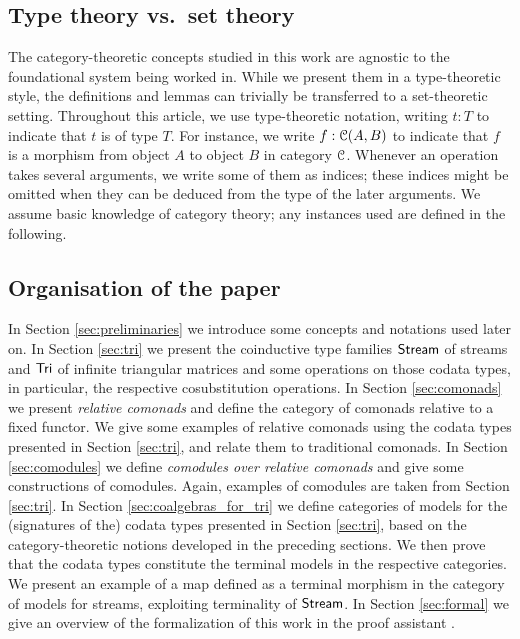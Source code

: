 \documentclass[a4paper,USenglish]{lipics}
\begin{document}
 \subsection{Type theory vs.\ set theory} \label{sec:type_vs_set} The category-theoretic concepts studied in this work are agnostic to the foundational system being worked in.
 While we present them in a type-theoretic style, the definitions and lemmas can trivially be transferred to a set-theoretic setting.
 Throughout this article, we use type-theoretic notation,  writing $t:T$ to indicate that $t$ is of type $T$. 
 For instance, we write $f : {\mathcal{C}}(A,B)$ to indicate that $f$ is a morphism from object $A$ to object $B$ in category ${\mathcal{C}}$.
 Whenever an operation takes several arguments, we write some of them as indices; these indices might be omitted when 
 they can be deduced from the type of the later arguments.
 We assume basic knowledge of category theory; any instances used are defined in the following.
  
 
 
 \subsection{Organisation of the paper} \label{sec:organisation}
  In Section \ref{sec:preliminaries} we introduce some concepts and notations used later on.
  In Section \ref{sec:tri} we present the coinductive type families $\mathsf{Stream}$ of streams and $\mathsf{Tri}$ of infinite triangular matrices and some operations on those codata types,
  in particular, the respective cosubstitution operations.
  In Section \ref{sec:comonads} we present \emph{relative comonads} and define the category of comonads relative to a fixed functor.
    We give some examples of relative comonads using the codata types presented in Section \ref{sec:tri}, 
    and relate them to traditional comonads.
  In Section \ref{sec:comodules} we define \emph{comodules over relative comonads} and give some constructions of comodules.
     Again, examples of comodules are taken from Section \ref{sec:tri}.
  In Section \ref{sec:coalgebras_for_tri} we define categories of models for the (signatures of the) codata types presented in Section \ref{sec:tri},
      based on the category-theoretic notions developed in the preceding sections.
      We then prove that the codata types constitute the terminal models in the respective categories.
      We present an example of a map defined as a terminal morphism in the category of models for streams, exploiting terminality of $\mathsf{Stream}$.
  In Section \ref{sec:formal} we give an overview of the formalization of this work in the proof assistant \coq.
  
\end{document}
